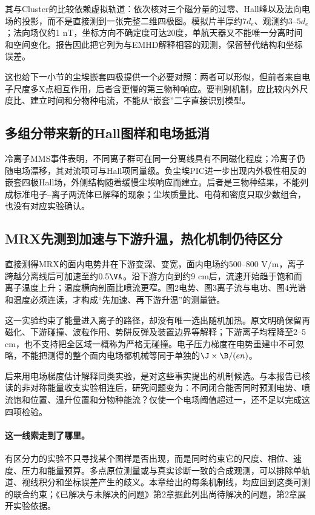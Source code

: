 \documentclass[UTF8,a4paper,11pt,openany,fontset=fandol]{ctexbook}
\begin{document}
其与Cluster的比较依赖虚拟轨道：依次核对三个磁分量的过零、Hall峰以及法向电场的投影，而不是直接测到一张完整二维四极图。模拟片半厚约$7d_e$、观测约$3$--$5d_e$；法向场仅约1 nT，坐标方向不确定度可达20度，单航天器又不能唯一分离时间和空间变化。报告因此把它列为与EMHD解释相容的观测，保留替代结构和坐标误差。

这也给下一小节的尘埃嵌套四极提供一个必要对照：两者可以形似，但前者来自电子尺度多X点相互作用，后者含更慢的第三物种响应。要判别机制，应比较内外尺度比、建立时间和分物种电流，不能从“嵌套”二字直接识别模型。

\subsection{多组分带来新的Hall图样和电场抵消}
冷离子MMS事件\citep{L227}表明，不同离子群可在同一分离线具有不同磁化程度；冷离子仍随电场漂移，其对流项可与Hall项同量级。负尘埃PIC\citep{L283}进一步出现内外极性相反的嵌套四极Hall场，外侧结构随着缓慢尘埃响应而建立。后者是三物种结果，不能列成标准电子--离子两流体已解释的现象；尘埃质量比、电荷和密度只取少数组合，也没有对应实验确认。

\subsection{MRX先测到加速与下游升温，热化机制仍待区分}\label{sec:synthesis-mrx}
\citet{Yoo2013}直接测得MRX的面内电势井在下游变深、变宽，面内电场约500--800 V/m，离子跨越分离线后可加速至约$0.5\VA$。沿下游方向到约9 cm后，流速开始趋于饱和而离子温度上升；温度横向剖面比喷流更窄。图2电势、图3离子流与电功、图4光谱和温度必须连读，才构成“先加速、再下游升温”的测量链。

这一实验约束了能量进入离子的路径，却没有唯一选出随机加热。原文明确保留再磁化、下游碰撞、波粒作用、势阱反弹及装置边界等解释；下游离子均程降至2--5 cm，也不支持把全区域一概称为严格无碰撞。电子压力梯度在电势重建中不可忽略，不能把测得的整个面内电场都机械等同于单独的$\J\times\B/(en)$。

\citet{L272}后来用电场梯度估计解释同类实验，是对这些事实提出的机制候选。与本报告已核读的非对称能量收支实验\citep{Yamada2018}相连后，研究问题变为：不同闭合能否同时预测电势、喷流饱和位置、温升位置和分物种能流？仅使一个电场阈值超过一，还不足以完成这四项检验。

\paragraph{这一线索走到了哪里。}有区分力的实验不只寻找某个图样是否出现，而是同时约束它的尺度、相位、速度、压力和能量预算。多点原位测量或与真实诊断一致的合成观测，可以排除单轨道、视线积分和坐标误差产生的歧义。本章给出的每条机制线，均应回到这类可测的联合约束；《已解决与未解决的问题》第2章据此列出尚待解决的问题，第2章展开实验依据。
\end{document}
